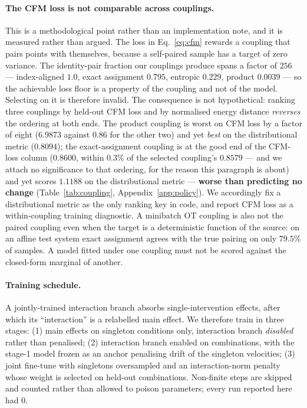 \documentclass{article}
\begin{document}
\paragraph{The CFM loss is not comparable across couplings.} This is a methodological point
rather than an implementation note, and it is measured rather than argued. The loss in
Eq.~\ref{eq:cfm} rewards a coupling that pairs points with themselves, because a
self-paired sample has a target of zero variance. The identity-pair fraction our couplings
produce spans a factor of $256$ --- index-aligned $1.0$, exact assignment $0.795$, entropic
$0.229$, product $0.0039$ --- so the achievable loss floor is a property
of the coupling and not of the model. Selecting on it is therefore invalid. The consequence
is not hypothetical: ranking three couplings by held-out CFM loss and by normalised energy
distance \emph{reverses} the ordering at both ends. The product coupling is worst on CFM
loss by a factor of eight ($6.9873$ against $0.86$ for the other two) and yet \emph{best} on
the distributional metric ($0.8094$); the exact-assignment coupling is at the good end of the
CFM-loss column ($0.8600$, within $0.3\%$ of the selected coupling's $0.8579$ --- and we
attach no significance to that ordering, for the reason this paragraph is about)
and yet scores $1.1188$ on the distributional metric --- \textbf{worse than
predicting no change} (Table~\ref{tab:coupling}, Appendix~\ref{app:policy}). We accordingly
fix a distributional metric as the only ranking key in code, and report CFM loss as a
within-coupling training diagnostic. A minibatch OT coupling is also not the paired coupling
even when the target is a deterministic function of the source: on an affine test system
exact assignment agrees with the true pairing on only $79.5\%$ of samples. A model fitted
under one coupling must not be scored against the closed-form marginal of another.

\paragraph{Training schedule.} A jointly-trained interaction branch absorbs single-intervention
effects, after which its ``interaction'' is a relabelled main effect. We therefore train in
three stages: (1) main effects on singleton conditions only, interaction branch \emph{disabled}
rather than penalised; (2) interaction branch enabled on combinations, with the stage-1 model
frozen as an anchor penalising drift of the singleton velocities; (3) joint fine-tune with
singletons oversampled and an interaction-norm penalty whose weight is selected on held-out
combinations. Non-finite steps are skipped and counted rather than allowed to poison
parameters; every run reported here had $0$.
\end{document}
